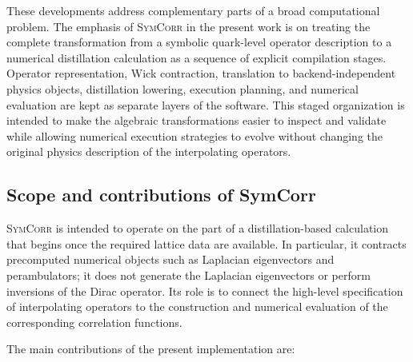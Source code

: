 \documentclass[11pt]{article}
\begin{document}
These developments address complementary parts of a broad computational
problem. The emphasis of \textsc{SymCorr} in the present work is on treating
the complete transformation from a symbolic quark-level operator description
to a numerical distillation calculation as a sequence of explicit compilation
stages. Operator representation, Wick contraction, translation to
backend-independent physics objects, distillation lowering, execution planning,
and numerical evaluation are kept as separate layers of the software. This
staged organization is intended to make the algebraic transformations easier to
inspect and validate while allowing numerical execution strategies to evolve
without changing the original physics description of the interpolating
operators.

\subsection{Scope and contributions of SymCorr}

\textsc{SymCorr} is intended to operate on the part of a distillation-based
calculation that begins once the required lattice data are available. In
particular, it contracts precomputed numerical objects such as Laplacian
eigenvectors and perambulators; it does not generate the Laplacian eigenvectors
or perform inversions of the Dirac operator. Its role is to connect the
high-level specification of interpolating operators to the construction and
numerical evaluation of the corresponding correlation functions.

The main contributions of the present implementation are:
\end{document}
